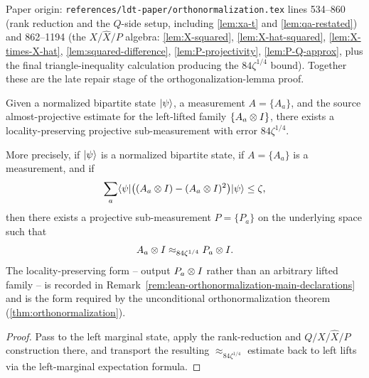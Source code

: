 \begin{lemma}\label{lem:locality-preserving-projectivization}
	\leanok
	Paper origin: \texttt{references/ldt-paper/orthonormalization.tex} lines 534--860 (rank reduction and the $Q$-side setup, including \ref{lem:xa-t} and \ref{lem:qa-restated}) and 862--1194 (the $X/\widehat X/P$ algebra: \ref{lem:X-squared}, \ref{lem:X-hat-squared}, \ref{lem:X-times-X-hat}, \ref{lem:squared-difference}, \ref{lem:P-projectivity}, \ref{lem:P-Q-approx}, plus the final triangle-inequality calculation producing the $84\zeta^{1/4}$ bound). Together these are the late repair stage of the orthogonalization-lemma proof.

	Given a normalized bipartite state $\lvert \psi \rangle$, a measurement
	$A = \{A_a\}$, and the source almost-projective estimate for the
	left-lifted family $\{A_a \otimes I\}$, there exists a locality-preserving
	projective sub-measurement with error $84\zeta^{1/4}$.

	More precisely, if $\lvert \psi \rangle$ is a normalized bipartite state, if
	$A = \{A_a\}$ is a measurement, and if
	\[
		\sum_a \langle \psi \rvert \bigl((A_a \otimes I) - (A_a \otimes I)^2\bigr) \lvert \psi \rangle \le \zeta,
	\]
	then there exists a projective sub-measurement $P = \{P_a\}$ on the underlying
	space such that
	\[
		A_a \otimes I \approx_{84\zeta^{1/4}} P_a \otimes I.
	\]
	The locality-preserving form -- output $P_a \otimes I$ rather than an arbitrary
	lifted family -- is recorded in
	Remark~\ref{rem:lean-orthonormalization-main-declarations} and is the form
	required by the unconditional orthonormalization theorem
	(\ref{thm:orthonormalization}).
\end{lemma}
\begin{proof}
	\leanok
	Pass to the left marginal state, apply the rank-reduction and
	$Q/X/\widehat X/P$ construction there, and transport the resulting
	$\approx_{84\zeta^{1/4}}$ estimate back to left lifts via the left-marginal
	expectation formula.
\end{proof}

